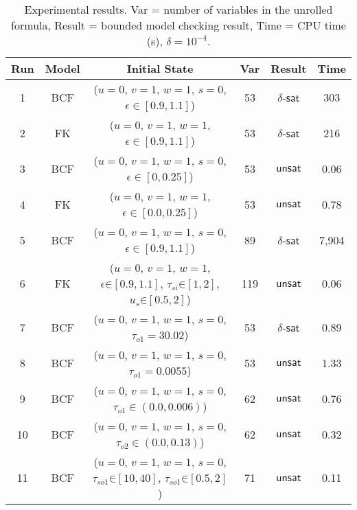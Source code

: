{\small
\begin{table}[!th]
  \centering
  \small
  \begin{tabular}{c|c|c|c|c|c}
    \hline
    \hline
    Run & Model   & Initial State  & Var  & Result   & Time   \\
    \hline
    \hline
    1 & BCF & ($u = 0$, $v = 1$, $w = 1$, $s = 0$, $\epsilon \in [0.9,1.1]$) & 53  & $\delta$-$\mathsf{sat}$  & 303 \\
    2 & FK & ($u = 0$, $v = 1$, $w = 1$, $\epsilon \in [0.9,1.1]$)  & 53 & $\delta$-$\mathsf{sat}$ & 216 \\
    3 & BCF & ($u = 0$, $v = 1$, $w = 1$, $s = 0$, $\epsilon \in [0,0.25]$) & 53  & $\mathsf{unsat}$  & 0.06 \\
    4 & FK & ($u = 0$, $v = 1$, $w = 1$, $\epsilon \in [0.0,0.25]$)  & 53 & $\mathsf{unsat}$ & 0.78 \\
    5 & BCF & ($u = 0$, $v = 1$, $w = 1$, $s = 0$, $\epsilon \in [0.9,1.1]$)  & 89  & $\delta$-$\mathsf{sat}$  & 7,904 \\
    6 & FK & ($u = 0$, $v = 1$, $w = 1$, $\epsilon \mathord{\in} [0.9,1.1]$, $\tau_{si} \mathord{\in} [1,2]$, $u_{s} \mathord{\in} [0.5,2]$)  & 119 & $\mathsf{unsat}$ & 0.06 \\   
    7 & BCF & ($u = 0$, $v = 1$, $w = 1$, $s = 0$, $\tau_{o1} = 30.02$) & 53  & $\delta$-$\mathsf{sat}$  & 0.89 \\        
    8 & BCF & ($u = 0$, $v = 1$, $w = 1$, $s = 0$, $\tau_{o1} = 0.0055$) & 53  & $\mathsf{unsat}$  & 1.33 \\        
    9 & BCF & ($u = 0$, $v = 1$, $w = 1$, $s = 0$, $\tau_{o1} \in (0.0, 0.006)$) & 62  & $\mathsf{unsat}$  & 0.76 \\        
    10 & BCF & ($u = 0$, $v = 1$, $w = 1$, $s = 0$, $\tau_{o2} \in (0.0, 0.13)$)  & 62  & $\mathsf{unsat}$  & 0.32 \\     
    11 & BCF & ($u = 0$, $v = 1$, $w = 1$, $s = 0$, $\tau_{so1} \mathord{\in} [10, 40]$, $\tau_{so1}\mathord{\in} [0.5, 2]$) & 71  & $\mathsf{unsat}$  & 0.11 \\   
    \hline
    \hline
  \end{tabular}
  \caption{\small Experimental results.
    Var = number of variables in the unrolled formula,
    Result = bounded model checking result,
    Time = CPU time (s),
    $\delta=10^{-4}$.
}\label{tbl:exp}
\end{table}
}

